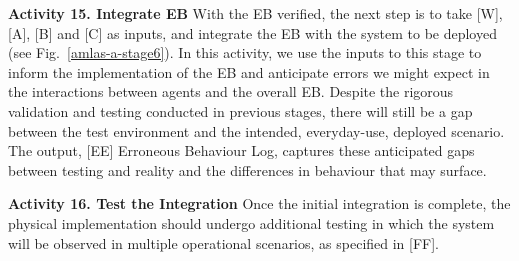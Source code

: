 \documentclass[runningheads]{llncs}
\begin{document}
\noindent\textbf{Activity 15. Integrate EB} With the EB verified, the next step is to take [W], [A], [B] and [C] as inputs, and integrate the EB with the system to be deployed (see Fig.~\ref{amlas-a-stage6}). In this activity, we use the inputs to this stage to inform the implementation of the EB and anticipate errors we might expect in the interactions between agents and the overall EB. Despite the rigorous validation and testing conducted in previous stages, there will still be a gap between the test environment and the intended, everyday-use, deployed scenario. The output, [EE] Erroneous Behaviour Log, captures these anticipated gaps between testing and reality and the differences in behaviour that may surface. 

\noindent\textbf{Activity 16. Test the Integration} Once the initial integration is complete, the physical implementation should undergo additional testing in which the system will be observed in multiple operational scenarios, as specified in [FF].
\end{document}
